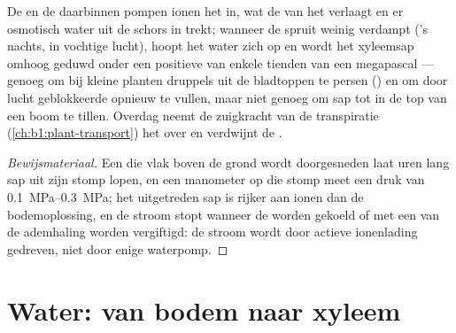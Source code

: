 \begin{proposition}[Worteldruk]\label{prop:b1:plant-water-minerals:rootpressure}
De  en de  daarbinnen pompen ionen het  in, wat de
 van het  verlaagt en er osmotisch water uit de schors
in trekt; wanneer de spruit weinig verdampt ('s nachts, in vochtige lucht),
hoopt het water zich op en wordt het xyleemsap omhoog geduwd onder een
positieve \emph{} van enkele tienden van een megapascal ---
genoeg om bij kleine planten druppels uit de bladtoppen te persen
(\emph{}) en om door lucht geblokkeerde  opnieuw te vullen,
maar niet genoeg om sap tot in de top van een boom te tillen. Overdag neemt
de zuigkracht van de transpiratie (\cref{ch:b1:plant-transport}) het over
en verdwijnt de .
\end{proposition}
\begin{proof}[Bewijsmateriaal]
Een  die vlak boven de grond wordt doorgesneden laat uren lang sap
uit zijn stomp lopen, en een manometer op die stomp meet een druk van
\qtyrange{0.1}{0.3}{MPa}; het uitgetreden sap is rijker aan ionen dan de
bodemoplossing, en de stroom stopt wanneer de  worden gekoeld of
met een  van de ademhaling worden vergiftigd: de stroom wordt door
actieve ionenlading gedreven, niet door enige waterpomp.
\end{proof}

\section{Water: van bodem naar xyleem}

